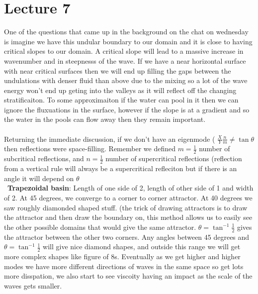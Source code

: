 \documentclass{article}
\begin{document}
\section{Lecture 7}
One of the questions that came up in the background on the chat on wednesday is imagine we have this undular boundary to our domain and it is close to having critical slopes to our domain. A critical slope will lead to a massive increase in wavenumber and in steepnesss of the wave. If we have a near horizontal surface with near critical surfaces then we will end up filling the gaps between the undulations with denser fluid than above due to the mixing so a lot of the wave energy won't end up geting into the valleys as it will reflect off the changing stratificaiton. To some approximaiton if the water can pool in it then we can ignore the fluxuations in the surface, however if the slope is at a gradient and so the water in the pools can flow away then they remain important. \\\\
Returning the immediate discussion, if we don't have an eigenmode ( $\frac{X}{Y} \frac{n}{m} \neq \tan \theta$ then reflections were space-filling. Remember we defined $m = \frac{1}{2}$ number of subcritical reflections, and $n = \frac{1}{2}$ number of supercritical reflections (reflection from a vertical rule will always be a supercritical refleciton but if there is an angle it will depend on $\theta$\\\
\textbf{Trapezoidal basin}:
Length of one side of 2, length of other side of 1 and width of 2. At 45 degrees, we converge to a corner to corner attractor. At 40 degrees we saw roughly diamonded shaped stuff. (the trick of drawing attractors is to draw the attractor and then draw the boundary on, this method allows us to easily see the other possible domains that would give the same attractor.  $\theta = \tan^{-1} \frac{1}{2}$ gives the attractor between the other two corners. Any angles between 45 degrees and $\theta = \tan^{-1} \frac{1}{2}$ will give nice diamond shapes, and outside this range we will get more complex shapes like figure of 8s. Eventually as we get higher and higher modes we have more different directions of waves in the same space so get lots more disspation, we also start to see viscoity having an impact as the scale of the waves gets smaller.\\\\
\end{document}
